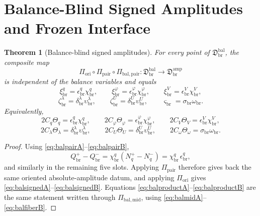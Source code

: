 \documentclass[11pt]{article}
\newcommand{\LiftSector}{\mathfrak D_{\mathrm{br}}^{\mathrm{amp}}}
\newcommand{\DeepReadAmp}{\xi_{\mathrm{br}}^{q}}
\newcommand{\DeepCovAmp}{\xi_{\mathrm{br}}^{\varphi}}
\newcommand{\DeepRelaxAmp}{\xi_{\mathrm{br}}^{V}}
\newcommand{\DeepWellAmp}{\zeta_{\mathrm{br}}^{\lambda}}
\newcommand{\DeepEqAmp}{\zeta_{\mathrm{br}}^{U}}
\newcommand{\DeepScaleAmp}{\varsigma_{\mathrm{br}}}
\newcommand{\AbsReadAmp}{\chi_{\mathrm{br}}^{q}}
\newcommand{\AbsCovAmp}{\chi_{\mathrm{br}}^{\varphi}}
\newcommand{\AbsRelaxAmp}{\chi_{\mathrm{br}}^{V}}
\newcommand{\AbsWellAmp}{\upsilon_{\mathrm{br}}^{\lambda}}
\newcommand{\AbsEqAmp}{\upsilon_{\mathrm{br}}^{U}}
\newcommand{\AbsScaleAmp}{\omega_{\mathrm{br}}}
\newcommand{\PolRead}{\epsilon_{\mathrm{br}}^{q}}
\newcommand{\PolCov}{\epsilon_{\mathrm{br}}^{\varphi}}
\newcommand{\PolRelax}{\epsilon_{\mathrm{br}}^{V}}
\newcommand{\PolWell}{\delta_{\mathrm{br}}^{\lambda}}
\newcommand{\PolEq}{\delta_{\mathrm{br}}^{U}}
\newcommand{\PolScale}{\sigma_{\mathrm{br}}}
\newcommand{\OriginMap}{\Pi_{\mathrm{ori}}}
\newcommand{\PairMap}{\Pi_{\mathrm{pair}}}
\newcommand{\PairReadPlus}{Q_{\mathrm{br}}^{+}}
\newcommand{\PairReadMinus}{Q_{\mathrm{br}}^{-}}
\newcommand{\MidRead}{C_{q}}
\newcommand{\MidCov}{C_{\varphi}}
\newcommand{\MidRelax}{C_{V}}
\newcommand{\MidWell}{C_{\lambda}}
\newcommand{\MidEq}{C_{U}}
\newcommand{\MidScale}{C_{\omega}}
\newcommand{\FiberRead}{\Theta_{q}}
\newcommand{\FiberCov}{\Theta_{\varphi}}
\newcommand{\FiberRelax}{\Theta_{V}}
\newcommand{\FiberWell}{\Theta_{\lambda}}
\newcommand{\FiberEq}{\Theta_{U}}
\newcommand{\FiberScale}{\Theta_{\omega}}
\newcommand{\MidBalanceSector}{\mathfrak D_{\mathrm{br}}^{\mathrm{bal}}}
\newcommand{\BalMidMap}{\Pi_{\mathrm{bal,mid}}}
\newcommand{\BalPairMap}{\Pi_{\mathrm{bal,pair}}}
\newcommand{\BalReadPlus}{N_{q}^{+}}
\newcommand{\BalReadMinus}{N_{q}^{-}}
\newtheorem{theorem}{Theorem}
\begin{document}
\section{Balance-Blind Signed Amplitudes and Frozen Interface}

\begin{theorem}[Balance-blind signed amplitudes]
\label{thm:balsigned}
For every point of \(\MidBalanceSector\), the composite map
\begin{equation}
\OriginMap\circ\PairMap\circ\BalPairMap
:
\MidBalanceSector
\longrightarrow
\LiftSector
\label{eq:balampcomposite}
\end{equation}
is independent of the balance variables and equals
\begin{equation}
\DeepReadAmp=\PolRead\AbsReadAmp,
\qquad
\DeepCovAmp=\PolCov\AbsCovAmp,
\qquad
\DeepRelaxAmp=\PolRelax\AbsRelaxAmp,
\label{eq:balsignedA}
\end{equation}
\begin{equation}
\DeepWellAmp=\PolWell\AbsWellAmp,
\qquad
\DeepEqAmp=\PolEq\AbsEqAmp,
\qquad
\DeepScaleAmp=\PolScale\AbsScaleAmp.
\label{eq:balsignedB}
\end{equation}
Equivalently,
\begin{equation}
2\MidRead\FiberRead=\PolRead\AbsReadAmp,
\qquad
2\MidCov\FiberCov=\PolCov\AbsCovAmp,
\qquad
2\MidRelax\FiberRelax=\PolRelax\AbsRelaxAmp,
\label{eq:balproductA}
\end{equation}
\begin{equation}
2\MidWell\FiberWell=\PolWell\AbsWellAmp,
\qquad
2\MidEq\FiberEq=\PolEq\AbsEqAmp,
\qquad
2\MidScale\FiberScale=\PolScale\AbsScaleAmp.
\label{eq:balproductB}
\end{equation}
\end{theorem}

\begin{proof}
Using \eqref{eq:balpairA}--\eqref{eq:balpairB},
\[
\PairReadPlus-\PairReadMinus
=
\AbsReadAmp(\BalReadPlus-\BalReadMinus)
=
\AbsReadAmp\,\PolRead,
\]
and similarly in the remaining five slots. Applying \(\PairMap\) therefore gives back the same oriented absolute-amplitude datum, and applying \(\OriginMap\) gives \eqref{eq:balsignedA}--\eqref{eq:balsignedB}. Equations \eqref{eq:balproductA}--\eqref{eq:balproductB} are the same statement written through \(\BalMidMap\), using \eqref{eq:balmidA}--\eqref{eq:balfiberB}.
\end{proof}
\end{document}
